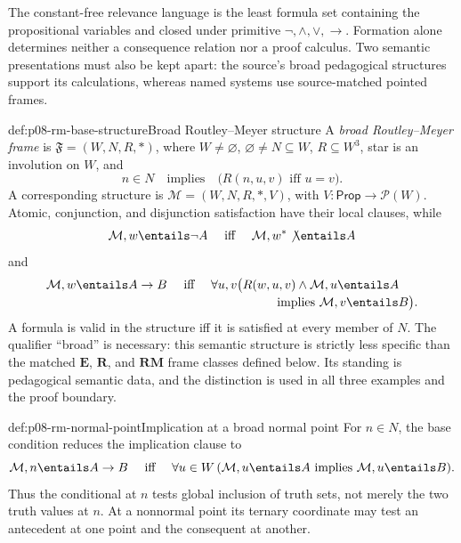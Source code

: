 The constant-free relevance language is the least formula set containing the
propositional variables and closed under primitive
\(\neg,\land,\lor,\to\).  Formation alone determines neither a consequence
relation nor a proof calculus.  Two semantic presentations must also be kept
apart: the source's broad pedagogical structures support its calculations,
whereas named systems use source-matched pointed frames.

\begin{hbdefinition}{def:p08-rm-base-structure}{Broad Routley--Meyer structure}
A \emph{broad Routley--Meyer frame} is
\(\mathfrak F=(W,N,R,{*})\), where \(W\ne\varnothing\),
\(\varnothing\ne N\subseteq W\), \(R\subseteq W^3\), star is an involution
on \(W\), and
\[
 n\in N\quad\text{implies}\quad
 \bigl(R(n,u,v)\text{ iff } u=v\bigr).
\]
A corresponding structure is \(\mathcal M=(W,N,R,{*},V)\), with
\(V:\mathsf{Prop}\to\mathcal P(W)\).  Atomic, conjunction, and disjunction
satisfaction have their local clauses, while
\[
 \mathcal M,w\entails\neg A
 \quad\text{ iff }\quad
 \mathcal M,w^*\not\entails A
\]
and
\[
 \begin{aligned}
 \mathcal M,w\entails A\to B
 &\quad\text{ iff }\quad
 \forall u,v\bigl(R(w,u,v)\land\mathcal M,u\entails A\\[-2pt]
 &\hspace{8.5em}\text{ implies }\mathcal M,v\entails B\bigr).
 \end{aligned}
\]
A formula is valid in the structure iff it is satisfied at every member of
\(N\).  The qualifier ``broad'' is necessary: this semantic structure is
strictly less specific than the matched \(\mathbf E\), \(\mathbf R\), and
\(\mathbf{RM}\) frame classes defined below.  Its standing is pedagogical
semantic data, and the distinction is used in all three examples and the
proof boundary.
\end{hbdefinition}

\begin{hbexample}{def:p08-rm-normal-point}{Implication at a broad normal point}
For \(n\in N\), the base condition reduces the implication clause to
\[
 \mathcal M,n\entails A\to B
 \quad\text{ iff }\quad
 \forall u\in W\,
   (\mathcal M,u\entails A\text{ implies }\mathcal M,u\entails B).
\]
Thus the conditional at \(n\) tests global inclusion of truth sets, not merely
the two truth values at \(n\).  At a nonnormal point its ternary coordinate
may test an antecedent at one point and the consequent at another.
\end{hbexample}

